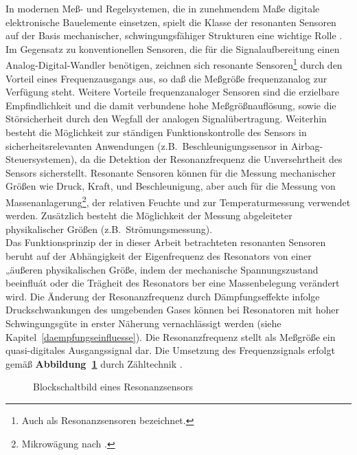 In modernen Meß- und Regelsystemen, die in zunehmendem Maße digitale
elektronische Bauelemente einsetzen, spielt die Klasse der resonanten
Sensoren auf der Basis mechanischer, schwingungsfähiger Strukturen eine
wichtige Rolle \cite{Bue91b}. Im Gegensatz zu
konventionellen Sensoren, die für die Signalaufbereitung einen
Analog-Digital-Wandler benötigen, zeichnen sich resonante
Sensoren\footnote{Auch als Resonanzsensoren bezeichnet.} durch
den Vorteil eines Frequenzausgangs aus, so daß die Meßgröße
frequenzanalog zur Verfügung steht. Weitere Vorteile frequenzanaloger
Sensoren sind die erzielbare Empfindlichkeit und die damit
verbundene hohe Meßgrößnauflösung, sowie die Störsicherheit durch
den Wegfall der analogen Signalübertragung. Weiterhin besteht
die Möglichkeit zur ständigen Funktionskontrolle des Sensors in
sicherheitsrelevanten Anwendungen (z.B.\ Beschleunigungssensor in
Airbag-Steuersystemen), da die Detektion der Resonanzfrequenz die
Unversehrtheit des Sensors sicherstellt. Resonante
Sensoren können für die Messung mechanischer Größen wie Druck, Kraft,
und Beschleunigung, aber auch für die Messung von
Massenanlagerung\footnote{Mikrowägung nach \cite{Sau59}.},
der relativen Feuchte und zur Temperaturmessung verwendet werden.
Zusätzlich besteht die Möglichkeit der Messung abgeleiteter physikalischer
Größen (z.B.\ Strömungsmessung).\\
Das Funktionsprinzip der in dieser Arbeit betrachteten
resonanten Sensoren beruht auf der Abhängigkeit der Eigenfrequenz
des Resonators von einer „äußeren physikalischen Größe, indem der
mechanische Spannungszustand beeinfluát oder die Trägheit des Resonators
ber eine Massenbelegung verändert wird. Die Änderung der
Resonanzfrequenz durch Dämpfungseffekte infolge Druckschwankungen des
umgebenden Gases
können bei Resonatoren mit hoher Schwingungsgüte in erster Näherung
vernachlässigt werden (siehe Kapitel~\ref{daempfungseinfluesse}).
Die Resonanzfrequenz stellt als Meßgröße
ein quasi-digitales Ausgangssignal dar. Die Umsetzung des Frequenzsignals
erfolgt gemäß {\bf Abbildung~\ref{abbprinzip}} durch Zähltechnik
\cite{ABV93}.
\begin{figure}[htb]
\begin{center}

\setresosen
\end{center}
 \caption{\label{abbprinzip}
 Blockschaltbild eines Resonanzsensors}
\end{figure}
